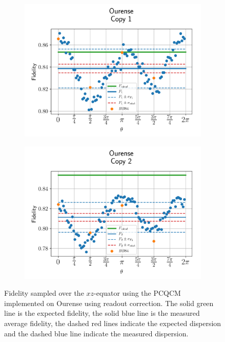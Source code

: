 \begin{figure}[H]
  \centering
  \begin{subfigure}{.5\textwidth}
    \centering
    \includegraphics[width=\textwidth]{Figures/PhaseCovariant/IBM/OnlyEquator/results_corrected_ourense_copy1.png}
    \label{fig:pc_corrected_ourense_equator_1}
  \end{subfigure}%
  \begin{subfigure}{.5\textwidth}
    \centering
    \includegraphics[width=\textwidth]{Figures/PhaseCovariant/IBM/OnlyEquator/results_corrected_ourense_copy2.png}
    \label{fig:pc_corrected_ourense_equator_2}
  \end{subfigure}
  \vspace{-0.5cm}
  \caption{Fidelity sampled over the $xz$-equator using the PCQCM implemented on Ourense using readout correction. The solid green line is the expected fidelity, the solid blue line is the measured average fidelity, the dashed red lines indicate the expected dispersion and the dashed blue line indicate the measured dispersion.}
  \label{fig:pc_corrected_ourense_equator}
\end{figure}


